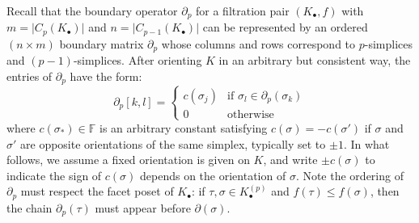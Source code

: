 \documentclass[10pt]{article}
\newcommand{\+}{%
	\raisebox{0.18ex}{\scaleobj{0.55}{+}}
}
\begin{document}
Recall that the boundary operator $\partial_p$ for a filtration pair $(K_{\bullet}, f)$ with $m = \lvert C_p(K_{\bullet}) \rvert$ and $n = \lvert C_{p-1}(K_{\bullet}) \rvert$ can be represented by an ordered $(n \times m)$ boundary matrix $\partial_p$ whose columns and rows correspond to $p$-simplices and $(p-1)$-simplices. After orienting $K$ in an arbitrary but consistent way, the entries of $\partial_p$ have the form: 
\begin{equation}\label{eq:matrix_pchain}
	\partial_p[k, l] = \begin{cases} 
	c(\sigma_j)  & \text{if } \sigma_l \in \partial_p(\sigma_k) \\
	0 & \text{otherwise}
   \end{cases}
\end{equation}
where $c(\sigma_\ast) \in \mathbb{F}$ is an arbitrary constant satisfying $c(\sigma) = -c(\sigma')$ if $\sigma$ and $\sigma'$ are opposite orientations of the same simplex, typically set to $\pm 1$. In what follows, we assume a fixed orientation is given on $K$, and write $\pm c(\sigma)$ to indicate the sign of $c(\sigma)$ depends on the orientation of $\sigma$. Note the ordering of $\partial_p$ must respect the facet poset of $K_\bullet$: if $\tau, \sigma \in K_\bullet^{(p)}$ and $f(\tau) \leq f(\sigma)$, then the chain $\partial_p(\tau)$ must appear before $\partial(\sigma)$. 

\end{document}
